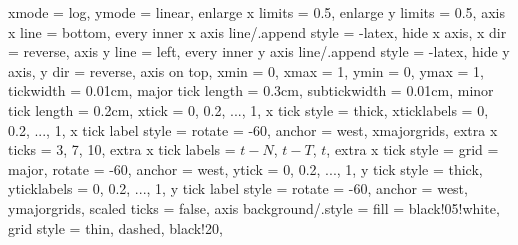 	xmode					= log, 
	ymode					= linear,
	enlarge x limits		= 0.5,
	enlarge y limits		= 0.5,
	axis x line				= bottom,	%
	every inner x axis line/.append style	= {-latex},
	hide x axis,
	x dir					= reverse,
	axis y line				= left,		%
	every inner y axis line/.append style	= {-latex},
	hide y axis,
	y dir					= reverse,
	axis on top,
	xmin					= 0,
	xmax					= 1,
	ymin					= 0,
	ymax					= 1,
	tickwidth				= {0.01cm},
	major tick length		= {0.3cm},
	subtickwidth			= {0.01cm},
	minor tick length		= {0.2cm},
	xtick					= {0, 0.2, ..., 1},
	x tick style 			= {thick},
	xticklabels				= {0, 0.2, ..., 1},
	x tick label style		= {rotate = -60, anchor = west},
	xmajorgrids,
	extra x ticks			= {3, 7, 10},
	extra x tick labels		= {$t - N$, $t - T$, $t$},
	extra x tick style		= {grid = major, rotate = -60, anchor = west},
	ytick					= {0, 0.2, ..., 1},
	y tick style 			= {thick},
	yticklabels				= {0, 0.2, ..., 1},
	y tick label style		= {rotate = -60, anchor = west},
	ymajorgrids,
	scaled ticks			= false, %
	axis background/.style	= {fill = black!05!white},
	grid style 				= {thin, dashed, black!20},
